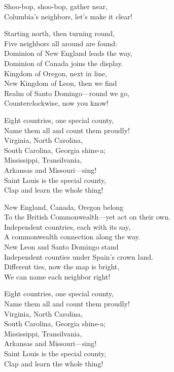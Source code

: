 \begin{lyrics}
Shoo-bop, shoo-bop, gather near,\\
Columbia’s neighbors, let’s make it clear!

Starting north, then turning round,\\
Five neighbors all around are found:\\
Dominion of New England leads the way,\\
Dominion of Canada joins the display.\\
Kingdom of Oregon, next in line,\\
New Kingdom of Leon, then we find\\
Realm of Santo Domingo—round we go,\\
Counterclockwise, now you know!

Eight countries, one special county,\\
Name them all and count them proudly!\\
Virginia, North Carolina,\\
South Carolina, Georgia shine-a;\\
Mississippi, Transilvania,\\
Arkansas and Missouri—sing!\\
Saint Louis is the special county,\\
Clap and learn the whole thing!

New England, Canada, Oregon belong\\
To the British Commonwealth—yet act on their own.\\
Independent countries, each with its say,\\
A commonwealth connection along the way.\\
New Leon and Santo Domingo stand\\
Independent counties under Spain’s crown land.\\
Different ties, now the map is bright,\\
We can name each neighbor right!

Eight countries, one special county,\\
Name them all and count them proudly!\\
Virginia, North Carolina,\\
South Carolina, Georgia shine-a;\\
Mississippi, Transilvania,\\
Arkansas and Missouri—sing!\\
Saint Louis is the special county,\\
Clap and learn the whole thing!


\end{lyrics}
